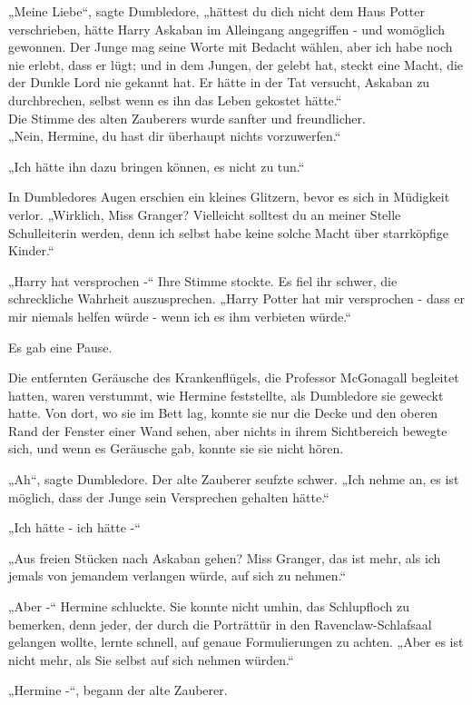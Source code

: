 {„Meine Liebe“, sagte Dumbledore, „hättest du dich nicht dem Haus Potter verschrieben, hätte Harry Askaban im Alleingang angegriffen - und womöglich gewonnen. Der Junge mag seine Worte mit Bedacht wählen, aber ich habe noch nie erlebt, dass er lügt; und in dem Jungen, der gelebt hat, steckt eine Macht, die der Dunkle Lord nie gekannt hat. Er hätte in der Tat versucht, Askaban zu durchbrechen, selbst wenn es ihn das Leben gekostet hätte.“\\ Die Stimme des alten Zauberers wurde sanfter und freundlicher.\\ „Nein, Hermine, du hast dir überhaupt nichts vorzuwerfen.“

„Ich hätte ihn dazu bringen können, es nicht zu tun.“

In Dumbledores Augen erschien ein kleines Glitzern, bevor es sich in Müdigkeit verlor. „Wirklich, Miss Granger? Vielleicht solltest du an meiner Stelle Schulleiterin werden, denn ich selbst habe keine solche Macht über starrköpfige Kinder.“

„Harry hat versprochen -“ Ihre Stimme stockte. Es fiel ihr schwer, die schreckliche Wahrheit auszusprechen. „Harry Potter hat mir versprochen - dass er mir niemals helfen würde - wenn ich es ihm verbieten würde.“

Es gab eine Pause.

Die entfernten Geräusche des Krankenflügels, die Professor McGonagall begleitet hatten, waren verstummt, wie Hermine feststellte, als Dumbledore sie geweckt hatte. Von dort, wo sie im Bett lag, konnte sie nur die Decke und den oberen Rand der Fenster einer Wand sehen, aber nichts in ihrem Sichtbereich bewegte sich, und wenn es Geräusche gab, konnte sie sie nicht hören.

„Ah“, sagte Dumbledore. Der alte Zauberer seufzte schwer. „Ich nehme an, es ist möglich, dass der Junge sein Versprechen gehalten hätte.“

„Ich hätte - ich hätte -“

„Aus freien Stücken nach Askaban gehen? Miss Granger, das ist mehr, als ich jemals von jemandem verlangen würde, auf sich zu nehmen.“

„Aber -“ Hermine schluckte. Sie konnte nicht umhin, das Schlupfloch zu bemerken, denn jeder, der durch die Porträttür in den Ravenclaw-Schlafsaal gelangen wollte, lernte schnell, auf genaue Formulierungen zu achten. „Aber es ist nicht mehr, als Sie selbst auf sich nehmen würden.“

„Hermine -“, begann der alte Zauberer.

}
